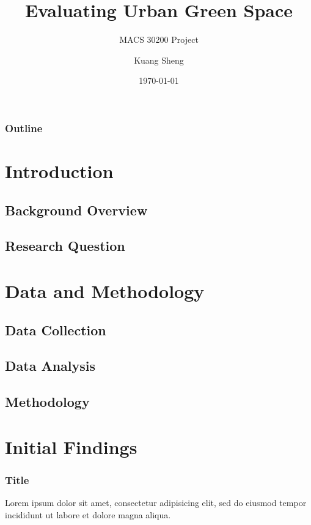 \documentclass{beamer}
\title{Evaluating Urban Green Space}
\subtitle{MACS 30200 Project}
\author{Kuang Sheng}
\institute{University of Chicago}
\date{\today}
\begin{document}
\begin{frame}
\titlepage
\end{frame}

\begin{frame}
\frametitle{Outline}
\tableofcontents
\end{frame}

\section{Introduction}
\subsection{Background Overview}
\subsection{Research Question}
\section{Data and Methodology}
\subsection{Data Collection}
\subsection{Data Analysis}
\subsection{Methodology}
\section{Initial Findings}


\begin{frame}
\frametitle{Title}
Lorem ipsum dolor sit amet, consectetur adipisicing elit, sed do eiusmod tempor incididunt ut labore et dolore magna aliqua.
\end{frame}
\end{document}
